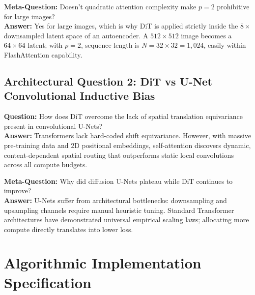 \documentclass[11pt,a4paper]{article}
\theoremstyle{definition}
\begin{document}
\textbf{Meta-Question:} Doesn't quadratic attention complexity make $p = 2$ prohibitive for large images?\\
\textbf{Answer:} Yes for large images, which is why DiT is applied strictly inside the $8\times$ downsampled latent space of an autoencoder. A $512 \times 512$ image becomes a $64 \times 64$ latent; with $p = 2$, sequence length is $N = 32 \times 32 = 1,024$, easily within FlashAttention capability.

\subsection{Architectural Question 2: DiT vs U-Net Convolutional Inductive Bias}
\textbf{Question:} How does DiT overcome the lack of spatial translation equivariance present in convolutional U-Nets?\\
\textbf{Answer:} Transformers lack hard-coded shift equivariance. However, with massive pre-training data and 2D positional embeddings, self-attention discovers dynamic, content-dependent spatial routing that outperforms static local convolutions across all compute budgets.

\textbf{Meta-Question:} Why did diffusion U-Nets plateau while DiT continues to improve?\\
\textbf{Answer:} U-Nets suffer from architectural bottlenecks: downsampling and upsampling channels require manual heuristic tuning. Standard Transformer architectures have demonstrated universal empirical scaling laws; allocating more compute directly translates into lower loss.

\section{Algorithmic Implementation Specification}
\end{document}
